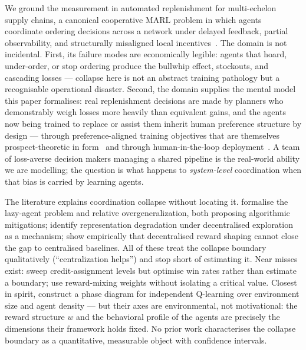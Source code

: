 \documentclass[letterpaper]{article}
\theoremstyle{plain}
\begin{document}
We ground the measurement in automated replenishment for multi-echelon
supply chains, a canonical cooperative MARL problem in which agents
coordinate ordering decisions across a network under delayed feedback,
partial observability, and structurally misaligned local
incentives~\citep{oroojlooyjadid2022,gijsbrechts2022}.
The domain is not incidental.
First, its failure modes are economically legible: agents that hoard,
under-order, or stop ordering produce the bullwhip effect, stockouts, and
cascading losses --- collapse here is not an abstract training pathology
but a recognisable operational disaster.
Second, the domain supplies the mental model this paper formalises:
real replenishment decisions are made by planners who demonstrably weigh
losses more heavily than equivalent gains, and the agents now being
trained to replace or assist them inherit human preference structure by
design --- through preference-aligned training objectives that are
themselves prospect-theoretic in form~\citep{ethayarajh2024kto} and
through human-in-the-loop deployment~\citep{lalmohammed2025}.
A team of loss-averse decision makers managing a shared pipeline is the
real-world ability we are modelling; the question is what happens to
\emph{system-level} coordination when that bias is carried by learning
agents.

The literature explains coordination collapse without locating it.
\citet{liu2023lazy} formalise the lazy-agent problem and
\citet{peng2023curo} relative overgeneralization, both proposing
algorithmic mitigations; \citet{weng2026} identify representation
degradation under decentralised exploration as a mechanism;
\citet{dmarl2025} show empirically that decentralised reward shaping
cannot close the gap to centralised baselines.
All of these treat the collapse boundary qualitatively
(``centralization helps'') and stop short of estimating it.
Near misses exist: \citet{wang2025maca} sweep credit-assignment levels
but optimise win rates rather than estimate a boundary;
\citet{jiang2018dgn} use reward-mixing weights without isolating a
critical value.
Closest in spirit, \citet{yamaguchi2025} construct a phase diagram for
independent Q-learning over environment size and agent density --- but
their axes are environmental, not motivational: the reward structure $w$
and the behavioral profile of the agents are precisely the dimensions
their framework holds fixed.
No prior work characterises the collapse boundary as a quantitative,
measurable object with confidence intervals.
\end{document}
